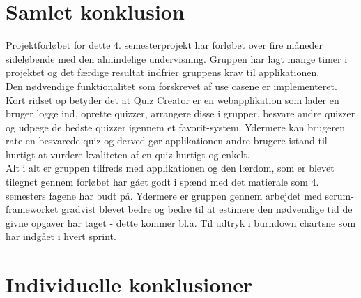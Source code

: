 \chapter{Samlet konklusion}
Projektforløbet for dette 4. semesterprojekt har forløbet over fire måneder sideløbende med den almindelige undervisning. Gruppen har lagt mange timer i projektet og det færdige resultat indfrier gruppens krav til applikationen.\\
Den nødvendige funktionalitet som forskrevet af use casene er implementeret. Kort ridset op betyder det at Quiz Creator er en webapplikation som lader en bruger logge ind, oprette quizzer, arrangere disse i grupper, besvare andre quizzer og udpege de bedste quizzer igennem et favorit-system. Ydermere kan brugeren rate en besvarede quiz og derved gør applikationen andre brugere istand til hurtigt at vurdere kvaliteten af en quiz hurtigt og enkelt.\\
Alt i alt er gruppen tilfreds med applikationen og den lærdom, som er blevet tilegnet gennem forløbet har gået godt i spænd med det matierale som 4. semesters fagene har budt på. Ydermere er gruppen gennem arbejdet med scrum-frameworket gradvist blevet bedre og bedre til at estimere den nødvendige tid de givne opgaver har taget - dette kommer bl.a. Til udtryk i burndown chartsne som har indgået i hvert sprint. 



\chapter{Individuelle konklusioner}









